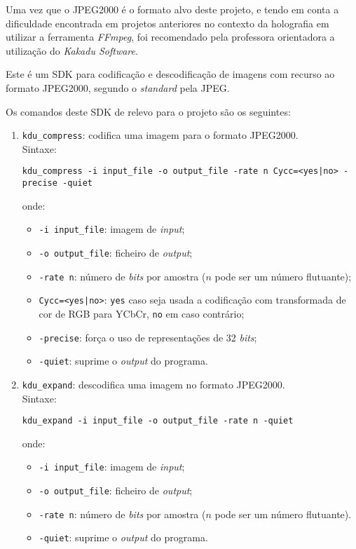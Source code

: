 Uma vez que o JPEG2000 é o formato alvo deste projeto, e tendo em conta a dificuldade encontrada em projetos anteriores no contexto da holografia em utilizar a ferramenta \textit{FFmpeg}, foi recomendado pela professora orientadora a utilização do \textit{Kakadu Software}.

Este é um \ac{SDK} para codificação e descodificação de imagens com recurso ao formato JPEG2000, segundo o \textit{standard} pela \ac{JPEG}.

Os comandos deste \ac{SDK} de relevo para o projeto são os seguintes:

\begin{enumerate}
    \item \texttt{kdu\_compress}: codifica uma imagem para o formato JPEG2000.\\
    Sintaxe:
    \begin{verbatim}
kdu_compress -i input_file -o output_file -rate n Cycc=<yes|no> -precise -quiet
    \end{verbatim}
    onde:
    \begin{itemize}
        \item \verb|-i input_file|: imagem de \textit{input};
        \item \verb|-o output_file|: ficheiro de \textit{output};
        \item \verb|-rate n|: número de \textit{bits} por amostra ($n$ pode ser um número flutuante);
        \item \verb#Cycc=<yes|no>#: \verb|yes| caso seja usada a codificação com transformada de cor de RGB para YCbCr, \verb|no| em caso contrário;
        \item \verb|-precise|: força o uso de representações de 32 \textit{bits};
        \item \verb|-quiet|: suprime o \textit{output} do programa.
    \end{itemize}
    
    \item \texttt{kdu\_expand}: descodifica uma imagem no formato JPEG2000.\\
    Sintaxe:
    \begin{verbatim}
kdu_expand -i input_file -o output_file -rate n -quiet
    \end{verbatim}
    onde:
    \begin{itemize}
        \item \verb|-i input_file|: imagem de \textit{input};
        \item \verb|-o output_file|: ficheiro de \textit{output};
        \item \verb|-rate n|: número de \textit{bits} por amostra ($n$ pode ser um número flutuante).
        \item \verb|-quiet|: suprime o \textit{output} do programa.
    \end{itemize}
\end{enumerate}

